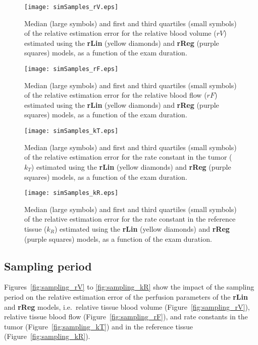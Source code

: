 \begin{subfigures}
    \begin{figure}\centering
        \texttt{[image: simSamples\_rV.eps]}
        \caption{Median (large symbols) and first and third quartiles (small symbols) of the relative estimation error for the relative blood volume ($rV$) estimated using the \textbf{rLin} (yellow diamonds) and \textbf{rReg} (purple squares) models, as a function of the exam duration.}
        \label{fig:examDuration_rV}
    \end{figure}
    \begin{figure}\centering
        \texttt{[image: simSamples\_rF.eps]}
        \caption{Median (large symbols) and first and third quartiles (small symbols) of the relative estimation error for the relative blood flow ($rF$) estimated using the \textbf{rLin} (yellow diamonds) and \textbf{rReg} (purple squares) models, as a function of the exam duration.}
        \label{fig:examDuration_rF}
    \end{figure}
    \begin{figure}\centering
        \texttt{[image: simSamples\_kT.eps]}
        \caption{Median (large symbols) and first and third quartiles (small symbols) of the relative estimation error for the rate constant in the tumor ($k_T$) estimated using the \textbf{rLin} (yellow diamonds) and \textbf{rReg} (purple squares) models, as a function of the exam duration.}
        \label{fig:examDuration_kT}
    \end{figure}
    \begin{figure}\centering
        \texttt{[image: simSamples\_kR.eps]}
        \caption{Median (large symbols) and first and third quartiles (small symbols) of the relative estimation error for the rate constant in the reference tissue ($k_R$) estimated using the \textbf{rLin} (yellow diamonds) and \textbf{rReg} (purple squares) models, as a function of the exam duration.}
        \label{fig:examDuration_kR}
    \end{figure}
\end{subfigures}

\subsection{Sampling period}
Figures~\ref{fig:sampling_rV} to \ref{fig:sampling_kR} show the impact of the sampling period on the relative estimation error of the perfusion parameters of the \textbf{rLin} and \textbf{rReg} models, i.e.~relative tissue blood volume (Figure~\ref{fig:sampling_rV}), relative tissue blood flow (Figure~\ref{fig:sampling_rF}), and rate constants in the tumor (Figure~\ref{fig:sampling_kT}) and in the reference tissue (Figure~\ref{fig:sampling_kR}).

